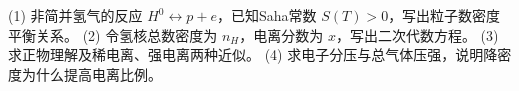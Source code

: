 (1) 非简并氢气的反应 \(H^0\leftrightarrow p+e\)，已知Saha常数 \(S(T)>0\)，写出粒子数密度平衡关系。
(2) 令氢核总数密度为 \(n_H\)，电离分数为 \(x\)，写出二次代数方程。
(3) 求正物理解及稀电离、强电离两种近似。
(4) 求电子分压与总气体压强，说明降密度为什么提高电离比例。
